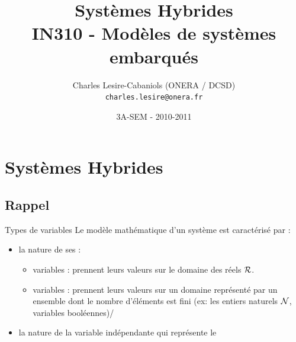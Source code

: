 \documentclass[compress]{beamer}
\title[SEM IN310 - SH]{Systèmes Hybrides\\
	IN310 - Modèles de systèmes embarqués}
\author[Charles Lesire]{Charles Lesire-Cabaniols (ONERA / DCSD)\\{\tt charles.lesire@onera.fr}}
\date[2010-2011]{3A-SEM - 2010-2011}
\begin{document}
\begin{frame}
\titlepage
\end{frame}

\begin{frame}
\tableofcontents[hidesubsections]
\end{frame}

\section{Systèmes Hybrides}
\subsection{Rappel}
\begin{frame}
\tableofcontents[currentsection]
\end{frame}

\begin{frame}{Types de variables}
Le modèle mathématique d'un système est caractérisé par :
\begin{itemize}
\item la nature de ses   :
	\begin{itemize}
	\item variables  :  prennent leurs valeurs sur le domaine des réels ${\cal R}$.
	\item variables  :  prennent leurs valeurs sur un domaine représenté par un ensemble  dont le nombre d'éléments est fini (ex: les  entiers naturels ${\cal N}$, variables booléennes)/
	\end{itemize} 
\item la nature de la variable indépendante qui représente le 
\end{itemize}
\end{frame}
\end{document}
